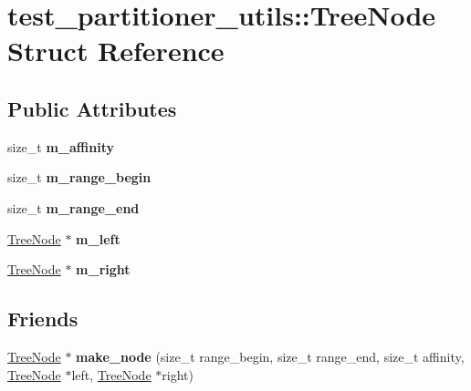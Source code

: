\hypertarget{structtest__partitioner__utils_1_1TreeNode}{}\section{test\+\_\+partitioner\+\_\+utils\+:\+:Tree\+Node Struct Reference}
\label{structtest__partitioner__utils_1_1TreeNode}
\subsection*{Public Attributes}
\begin{DoxyCompactItemize}
\item 
\hypertarget{structtest__partitioner__utils_1_1TreeNode_afff33323094284e17992625769809cc7}{}size\+\_\+t {\bfseries m\+\_\+affinity}\label{structtest__partitioner__utils_1_1TreeNode_afff33323094284e17992625769809cc7}

\item 
\hypertarget{structtest__partitioner__utils_1_1TreeNode_a393a6527a88066b0abbbea64d5d29d6a}{}size\+\_\+t {\bfseries m\+\_\+range\+\_\+begin}\label{structtest__partitioner__utils_1_1TreeNode_a393a6527a88066b0abbbea64d5d29d6a}

\item 
\hypertarget{structtest__partitioner__utils_1_1TreeNode_a5fa4e19f5d0c31d8e8bf937425a24c44}{}size\+\_\+t {\bfseries m\+\_\+range\+\_\+end}\label{structtest__partitioner__utils_1_1TreeNode_a5fa4e19f5d0c31d8e8bf937425a24c44}

\item 
\hypertarget{structtest__partitioner__utils_1_1TreeNode_a65112c7686ae67ba52c5620031231b97}{}\hyperlink{structtest__partitioner__utils_1_1TreeNode}{Tree\+Node} $\ast$ {\bfseries m\+\_\+left}\label{structtest__partitioner__utils_1_1TreeNode_a65112c7686ae67ba52c5620031231b97}

\item 
\hypertarget{structtest__partitioner__utils_1_1TreeNode_a437a36891dd82572b27f3ac89d9a9f69}{}\hyperlink{structtest__partitioner__utils_1_1TreeNode}{Tree\+Node} $\ast$ {\bfseries m\+\_\+right}\label{structtest__partitioner__utils_1_1TreeNode_a437a36891dd82572b27f3ac89d9a9f69}

\end{DoxyCompactItemize}
\subsection*{Friends}
\begin{DoxyCompactItemize}
\item 
\hypertarget{structtest__partitioner__utils_1_1TreeNode_a29ada56ff84ee50978cb30180645fdae}{}\hyperlink{structtest__partitioner__utils_1_1TreeNode}{Tree\+Node} $\ast$ {\bfseries make\+\_\+node} (size\+\_\+t range\+\_\+begin, size\+\_\+t range\+\_\+end, size\+\_\+t affinity, \hyperlink{structtest__partitioner__utils_1_1TreeNode}{Tree\+Node} $\ast$left, \hyperlink{structtest__partitioner__utils_1_1TreeNode}{Tree\+Node} $\ast$right)\label{structtest__partitioner__utils_1_1TreeNode_a29ada56ff84ee50978cb30180645fdae}

\end{DoxyCompactItemize}


